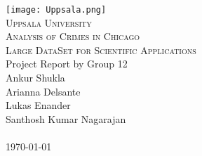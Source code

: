 \documentclass[a4paper]{article}
\begin{document}
\begin{titlepage}
\begin{center}
\texttt{[image: Uppsala.png]} \\
\makeatletter
\vspace*{0.8cm}
\vspace{1 cm}
\textsc{\Large Uppsala University\\ }
\textsc{\large Analysis of Crimes in Chicago\\}
\textsc{\large Large DataSet for Scientific Applications}
\textsc{\Large}\\[0.3cm]
\textnormal{\large Project Report by Group 12}\\
\textnormal{Ankur Shukla}\\
\textnormal{Arianna Delsante}\\
\textnormal{Lukas Enander}\\
\textnormal{Santhosh Kumar Nagarajan}\\
\textnormal{\\\today}
\end{center}
\end{titlepage}










\end{document}
